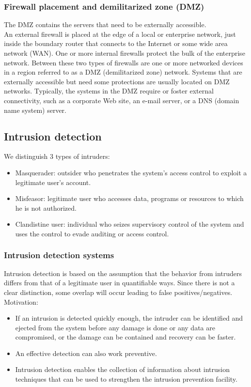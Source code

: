 \documentclass[12pt]{article}
\begin{document}
 \subsubsection{Firewall placement and demilitarized zone (DMZ)}
 The DMZ contains the servers that need to be externally accessible.\\
 An external firewall is placed at the edge of a local or enterprise network, just inside the boundary router that connects to the Internet or some wide area network (WAN). One or more internal firewalls protect the bulk of the enterprise network. Between these two types of firewalls are one or more networked devices in a region referred to
 as a DMZ (demilitarized zone) network. Systems that are externally accessible but need some protections are usually located on DMZ networks. Typically, the systems in the DMZ require or foster external connectivity, such as a corporate Web site, an e-mail server, or a DNS (domain name system) server.
 
 \subsection{Intrusion detection}
 We distinguish 3 types of intruders:
 \begin{itemize}
 	\item Masquerader: outsider who penetrates the system's access control to exploit a legitimate user's account.
 	\item Misfeasor: legitimate user who accesses data, programs or resources to which he is not authorized.
 	\item Clandistine user: individual who seizes supervisory control of the system and uses the control to evade auditing or access control.
 \end{itemize}
 
 \subsubsection{Intrusion detection systems}
 Intrusion detection is based on the assumption that the behavior from intruders differs from that of a legitimate user in quantifiable ways. Since there is not a clear distinction, some overlap will occur leading to false positives/negatives.\\
 Motivation:
 \begin{itemize}
 	\item If an intrusion is detected quickly enough, the intruder can be identified and ejected from the system before any damage is done or any data are compromised, or the damage can be contained and recovery can be faster.
 	\item An effective detection can also work preventive.
 	\item Intrusion detection enables the collection of information about intrusion techniques that can be used to strengthen the intrusion prevention facility.
 \end{itemize}
 
\end{document}
